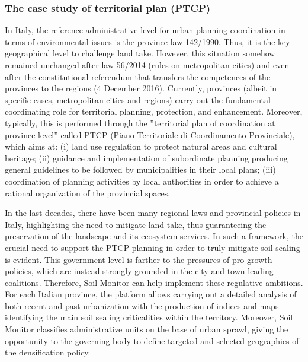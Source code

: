 \documentclass[APA,LATO1COL,doublespace]{WileyNJD-v2}
\begin{document}
\subsubsection{The case study of territorial plan (PTCP)}
In Italy, the reference administrative level for urban planning coordination in terms of environmental issues is the province law 142/1990. 
Thus, it is the key geographical level to challenge land take. 
However, this situation somehow remained unchanged after law 56/2014 (rules on metropolitan cities) and even after the constitutional referendum that transfers the competences of the provinces to the regions (4 December 2016).
Currently, provinces (albeit in specific cases, metropolitan cities and regions) carry out the fundamental coordinating role for territorial planning, protection, and enhancement. 
Moreover, typically, this is performed through the ''territorial plan of coordination at province level'' called PTCP (Piano Territoriale di Coordinamento Provinciale), which aims at: (i) land use regulation to protect natural areas and cultural heritage; (ii) guidance and implementation of subordinate planning producing general guidelines to be followed by municipalities in their local plans; (iii) coordination of planning activities by local authorities in order to achieve a rational organization of the provincial spaces.

In the last decades, there have been many regional laws and provincial policies in Italy, highlighting the need to mitigate land take, thus guaranteeing the preservation of the landscape and its ecosystem services. 
In such a framework, the crucial need to support the PTCP planning in order to truly mitigate soil sealing is evident. 
This government level is farther to the pressures of pro-growth policies, which are instead strongly grounded in the city and town leading coalitions.
Therefore, Soil Monitor can help implement these regulative ambitions.
For each Italian province, the platform allows carrying out a detailed analysis of both recent and past urbanization with the production of indices and maps identifying the main soil sealing criticalities within the territory.
Moreover, Soil Monitor classifies administrative units on the base of urban sprawl, giving the opportunity to the governing body to define targeted and selected geographies of the densification policy.

\end{document}
